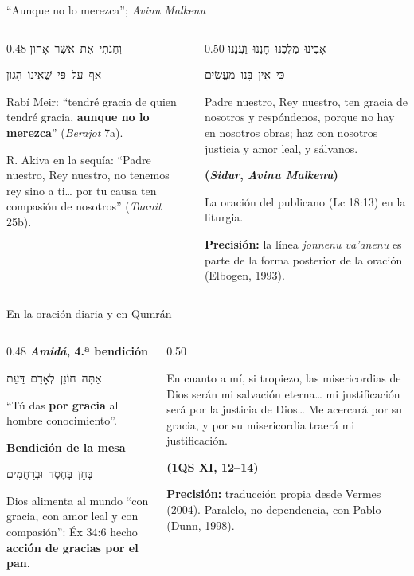 \documentclass[hyperref={bookmarks=false},aspectratio=169]{beamer}
\newcommand{\heb}[1]{\mbox{\foreignlanguage{hebrew}{#1}}}
\newcommand{\fuente}[1]{\par\hfill{\upshape\bfseries\footnotesize\textcolor{azul}{#1}}}
\newcommand{\destacar}[1]{\textbf{\textcolor{azul}{#1}}}
\newcommand{\precision}[1]{{\footnotesize\color{gris}\textbf{Precisión:} #1}}
\begin{document}
\begin{frame}{``Aunque no lo merezca''; \emph{Avinu Malkenu}}
\begin{columns}[t,onlytextwidth]
\begin{column}{0.48\textwidth}
\centering\heb{וְחַנֹּתִי אֶת אֲשֶׁר אָחוֹן}\par\heb{אַף עַל פִּי שֶׁאֵינוֹ הָגוּן}\par\smallskip
\RaggedRight\small Rabí Meir: ``tendré gracia de quien tendré gracia, \destacar{aunque no lo merezca}'' (\emph{Berajot} 7a).\par\medskip
\scriptsize R. Akiva en la sequía: ``Padre nuestro, Rey nuestro, no tenemos rey sino a ti\ldots{} por tu causa ten compasión de nosotros'' (\emph{Taanit} 25b).
\end{column}
\begin{column}{0.50\textwidth}
\centering\heb{אָבִינוּ מַלְכֵּנוּ חָנֵּנוּ וַעֲנֵנוּ}\par\heb{כִּי אֵין בָּנוּ מַעֲשִׂים}
\begin{cita}Padre nuestro, Rey nuestro, ten gracia de nosotros y respóndenos, porque no hay en nosotros obras; haz con nosotros justicia y amor leal, y sálvanos.\fuente{(\emph{Sidur}, \emph{Avinu Malkenu})}\end{cita}
\scriptsize La oración del publicano (Lc 18:13) en la liturgia.\par
\precision{la línea \emph{jonnenu va'anenu} es parte de la forma posterior de la oración (Elbogen, 1993).}
\end{column}
\end{columns}
\end{frame}

\begin{frame}{En la oración diaria y en Qumrán}
\begin{columns}[t,onlytextwidth]
\begin{column}{0.48\textwidth}\small\RaggedRight
\textbf{\textcolor{azul}{\emph{Amidá}, 4.ª bendición}}\par
\centering\heb{אַתָּה חוֹנֵן לְאָדָם דַּעַת}\par\RaggedRight
``Tú das \destacar{por gracia} al hombre conocimiento''.\par\medskip
\textbf{\textcolor{azul}{Bendición de la mesa}}\par
\centering\heb{בְּחֵן בְּחֶסֶד וּבְרַחֲמִים}\par\RaggedRight
Dios alimenta al mundo ``con gracia, con amor leal y con compasión'': Éx 34:6 hecho \destacar{acción de gracias por el pan}.
\end{column}
\begin{column}{0.50\textwidth}
\begin{cita}En cuanto a mí, si tropiezo, las misericordias de Dios serán mi salvación eterna\ldots{} mi justificación será por la justicia de Dios\ldots{} Me acercará por su gracia, y por su misericordia traerá mi justificación.\fuente{(1QS XI, 12--14)}\end{cita}
\precision{traducción propia desde Vermes (2004). Paralelo, no dependencia, con Pablo (Dunn, 1998).}
\end{column}
\end{columns}
\end{frame}
\end{document}
